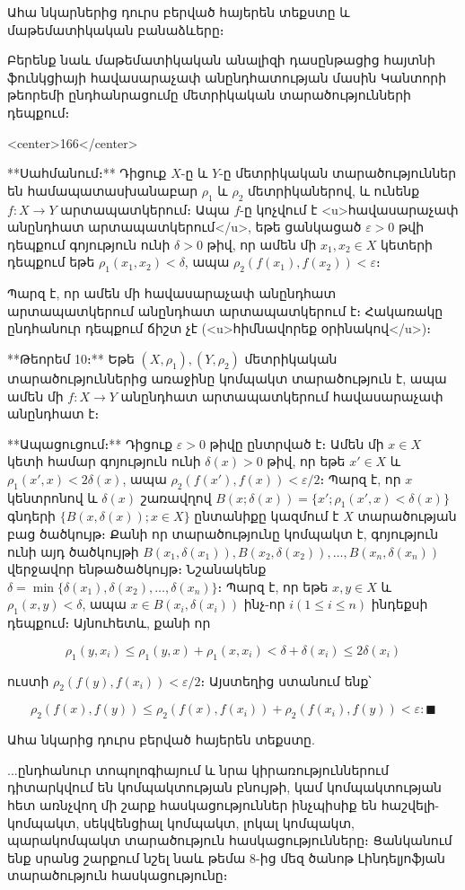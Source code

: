 Ահա նկարներից դուրս բերված հայերեն տեքստը և մաթեմատիկական բանաձևերը։

Բերենք նաև մաթեմատիկական անալիզի դասընթացից հայտնի ֆունկցիայի հավասարաչափ անընդհատության մասին Կանտորի թեորեմի ընդհանրացումը մետրիկական տարածությունների դեպքում։

<center>166</center>

**Սահմանում։** Դիցուք $X$-ը և $Y$-ը մետրիկական տարածություններ են համապատասխանաբար $\rho_1$ և $\rho_2$ մետրիկաներով, և ունենք $f: X \to Y$ արտապատկերում։ Ապա $f$-ը կոչվում է <u>հավասարաչափ անընդհատ արտապատկերում</u>, եթե ցանկացած $\varepsilon > 0$ թվի դեպքում գոյություն ունի $\delta > 0$ թիվ, որ ամեն մի $x_1, x_2 \in X$ կետերի դեպքում եթե $\rho_1(x_1, x_2) < \delta$, ապա $\rho_2(f(x_1), f(x_2)) < \varepsilon$։

Պարզ է, որ ամեն մի հավասարաչափ անընդհատ արտապատկերում անընդհատ արտապատկերում է։ Հակառակը ընդհանուր դեպքում ճիշտ չէ (<u>հիմնավորեք օրինակով</u>)։

**Թեորեմ 10։** Եթե $(X, \rho_1), (Y, \rho_2)$ մետրիկական տարածություններից առաջինը կոմպակտ տարածություն է, ապա ամեն մի $f: X \to Y$ անընդհատ արտապատկերում հավասարաչափ անընդհատ է։

**Ապացուցում։** Դիցուք $\varepsilon > 0$ թիվը ընտրված է։ Ամեն մի $x \in X$ կետի համար գոյություն ունի $\delta(x) > 0$ թիվ, որ եթե $x' \in X$ և $\rho_1(x', x) < 2\delta(x)$, ապա $\rho_2(f(x'), f(x)) < \varepsilon/2$։ Պարզ է, որ $x$ կենտրոնով և $\delta(x)$ շառավղով $B(x; \delta(x)) = \{x' ; \rho_1(x', x) < \delta(x)\}$ գնդերի $\{B(x, \delta(x)); x \in X\}$ ընտանիքը կազմում է $X$ տարածության բաց ծածկույթ։ Քանի որ տարածությունը կոմպակտ է, գոյություն ունի այդ ծածկույթի $B(x_1, \delta(x_1)), B(x_2, \delta(x_2)), \dots, B(x_n, \delta(x_n))$ վերջավոր ենթածածկույթ։ Նշանակենք $\delta = \min\{\delta(x_1), \delta(x_2), \dots, \delta(x_n)\}$։ Պարզ է, որ եթե $x, y \in X$ և $\rho_1(x, y) < \delta$, ապա $x \in B(x_i, \delta(x_i))$ ինչ-որ $i (1 \le i \le n)$ ինդեքսի դեպքում։ Այնուհետև, քանի որ


$$\rho_1(y, x_i) \le \rho_1(y, x) + \rho_1(x, x_i) < \delta + \delta(x_i) \le 2\delta(x_i)$$


ուստի $\rho_2(f(y), f(x_i)) < \varepsilon/2$։ Այստեղից ստանում ենք՝


$$\rho_2(f(x), f(y)) \le \rho_2(f(x), f(x_i)) + \rho_2(f(x_i), f(y)) < \varepsilon: \blacksquare$$


Ահա նկարից դուրս բերված հայերեն տեքստը.

...ընդհանուր տոպոլոգիայում և նրա կիրառություններում դիտարկվում են կոմպակտության բնույթի, կամ կոմպակտության հետ առնչվող մի շարք հասկացություններ ինչպիսիք են հաշվելի-կոմպակտ, սեկվենցիալ կոմպակտ, լոկալ կոմպակտ, պարակոմպակտ տարածություն հասկացությունները։ Ցանկանում ենք սրանց շարքում նշել նաև թեմա 8-ից մեզ ծանոթ Լինդելյոֆյան տարածություն հասկացությունը։


